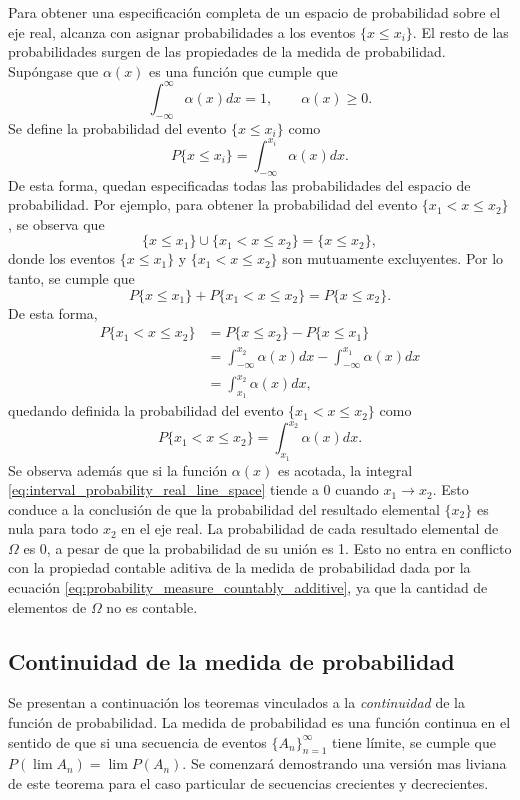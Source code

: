 \documentclass[a4paper]{report}
\begin{document}
Para obtener una especificación completa de un espacio de probabilidad sobre el eje real, alcanza con asignar probabilidades a los eventos \(\{x\leq x_i\}\). El resto de las probabilidades surgen de las propiedades de la medida de probabilidad. Supóngase que \(\alpha(x)\) es una función que cumple que
\[
 \int_{-\infty}^{\infty}\alpha(x)dx=1,\qquad \alpha(x)\geq 0.
\]
Se define la probabilidad del evento \(\{x\leq x_i\}\) como
\[
 P\{x\leq x_i\}=\int_{-\infty}^{x_i}\alpha(x)dx.
\]
De esta forma, quedan especificadas todas las probabilidades del espacio de probabilidad. Por ejemplo, para obtener la probabilidad del evento \(\{x_1<x\leq x_2\}\), se observa que
\[
 \{x\leq x_1\}\cup\{x_1<x\leq x_2\}=\{x\leq x_2\},
\]
donde los eventos \(\{x\leq x_1\}\) y \(\{x_1<x\leq x_2\}\) son mutuamente excluyentes. Por lo tanto, se cumple que
\[
 P\{x\leq x_1\}+P\{x_1<x\leq x_2\}=P\{x\leq x_2\}.
\]
De esta forma,
\begin{align*}
 P\{x_1<x\leq x_2\}&=P\{x\leq x_2\}-P\{x\leq x_1\}\\
   &=\int_{-\infty}^{x_2}\alpha(x)dx-\int_{-\infty}^{x_1}\alpha(x)dx\\
   &=\int_{x_1}^{x_2}\alpha(x)dx,
\end{align*}
quedando definida la probabilidad del evento \(\{x_1<x\leq x_2\}\) como
\begin{equation}\label{eq:interval_probability_real_line_space}
 P\{x_1<x\leq x_2\}=\int_{x_1}^{x_2}\alpha(x)dx.
\end{equation}
Se observa además que si la función \(\alpha(x)\) es acotada, la integral \ref{eq:interval_probability_real_line_space} tiende a 0 cuando \(x_1\to x_2\). Esto conduce a la conclusión de que la probabilidad del resultado elemental \(\{x_2\}\) es nula para todo \(x_2\) en el eje real. La probabilidad de cada resultado elemental de \(\Omega\) es 0, a pesar de que la probabilidad de su unión es 1. Esto no entra en conflicto con la propiedad contable aditiva de la medida de probabilidad dada por la ecuación \ref{eq:probability_measure_countably_additive}, ya que la cantidad de elementos de \(\Omega\) no es contable.

\subsection{Continuidad de la medida de probabilidad}\label{sec:probability_measure_continuity} 

Se presentan a continuación los teoremas vinculados a la \emph{continuidad} de la función de probabilidad. La medida de probabilidad es una función continua en el sentido de que si una secuencia de eventos \(\{A_n\}_{n=1}^{\infty}\) tiene límite, se cumple que \(P(\lim A_n)=\lim P(A_n)\). Se comenzará demostrando una versión mas liviana de este teorema para el caso particular de secuencias crecientes y decrecientes.
\end{document}
